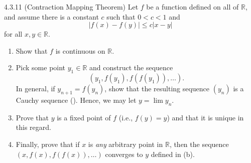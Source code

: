 \begin{exercise}
    {4.3.11 (Contraction Mapping Theorem)} Let \(f\) be a function defined on all of \(\mathbb{R}\), and assume there is a constant \(c\) such that \(0 < c < 1\) and
    \[
        |f(x) - f(y)| \leq c|x - y|
    \]
    for all \(x, y \in \mathbb{R}\).
    \begin{enumerate}
        \item Show that \(f\) is continuous on \(\mathbb{R}\).
        \item Pick some point \(y_1 \in \mathbb{R}\) and construct the sequence
              \[
                  (y_1, f(y_1), f(f(y_1)), \ldots).
              \]
              In general, if \(y_{n+1} = f(y_n)\), show that the resulting sequence \((y_n)\) is a Cauchy sequence (). Hence, we may let \(y = \lim y_n\).
        \item Prove that \(y\) is a fixed point of \(f\) (i.e., \(f(y) = y\)) and that it is unique in this regard.
        \item Finally, prove that if \(x\) is \textit{any} arbitrary point in \(\mathbb{R}\), then the sequence \((x,f(x),f(f(x)),\dots)\) converges to \(y\) defined in (b).
    \end{enumerate}
\end{exercise}

